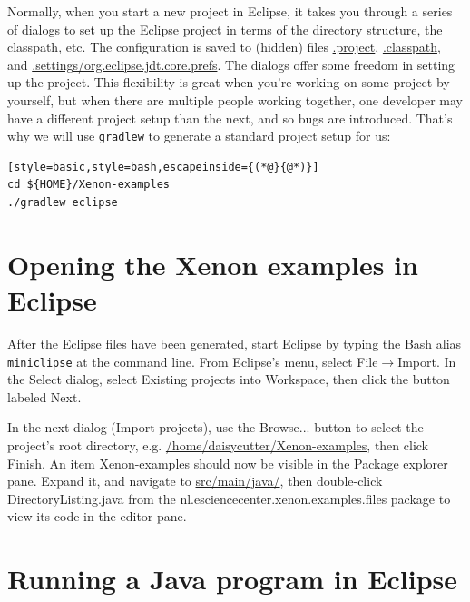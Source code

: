 \documentclass[12pt, a4paper, twoside, openany, titlepage]{book}
\begin{document}
Normally, when you start a new project in Eclipse, it takes you through a series of dialogs to set up the Eclipse project in terms of the directory structure, the classpath, etc. The configuration is saved to (hidden) files \url{.project}, \url{.classpath}, and \url{.settings/org.eclipse.jdt.core.prefs}. The dialogs offer some freedom in setting up the project. This flexibility is great when you're working on some project by yourself, but when there are multiple people working together, one developer may have a different project setup than the next, and so bugs are introduced. That's why we will use \texttt{gradlew} to generate a standard project setup for us:

\begin{lstlisting}[style=basic,style=bash,escapeinside={(*@}{@*)}]
cd ${HOME}/Xenon-examples
./gradlew eclipse
\end{lstlisting} %

\section{Opening the Xenon examples in Eclipse}

After the Eclipse files have been generated, start Eclipse by typing the Bash alias \texttt{miniclipse} at the command line. From Eclipse's menu, select \textsf{File}$\rightarrow$\textsf{Import}. In the \textsf{Select} dialog, select \textsf{Existing projects into Workspace}, then click the button labeled \textsf{Next}.

In the next dialog (\textsf{Import projects}), use the \textsf{Browse...} button to select the project's root directory, e.g. \url{/home/daisycutter/Xenon-examples}, then click \textsf{Finish}. An item \textsf{Xenon-examples} should now be visible in the \textsf{Package explorer} pane. Expand it, and navigate to \url{src/main/java/}, then double-click \textsf{DirectoryListing.java} from the \textsf{nl.esciencecenter.xenon.examples.files} package to view its code in the editor pane.




\section{Running a Java program in Eclipse}

\end{document}
